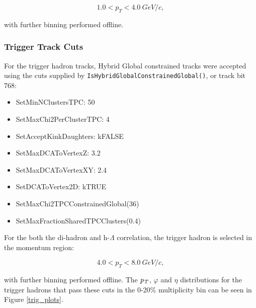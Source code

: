 \documentclass[ALICE,manyauthors]{ALICE_analysis_notes}
\begin{document}
$${1.0 < p_{T} < \SI{4.0}{GeV/c}},$$

with further binning performed offline.

\subsubsection{Trigger Track Cuts}
\label{trigcuts}
For the trigger hadron tracks, Hybrid Global constrained tracks were accepted using the cuts supplied by \texttt{IsHybridGlobalConstrainedGlobal()}, or track bit 768:

\begin{itemize}
	\item SetMinNClustersTPC: 50
	\item SetMaxChi2PerClusterTPC: 4
	\item SetAcceptKinkDaughters: kFALSE
	\item SetMaxDCAToVertexZ: 3.2
	\item SetMaxDCAToVertexXY: 2.4
	\item SetDCAToVertex2D: kTRUE
	\item SetMaxChi2TPCConstrainedGlobal(36)
	\item SetMaxFractionSharedTPCClusters(0.4)
\end{itemize}

For the both the di-hadron and h-$\Lambda$ correlation, the trigger hadron is selected in the momentum region:

$${4.0 < p_{T} < \SI{8.0}{GeV/c}},$$

with further binning performed offline. The $\it{p}_{T}$, $\varphi$ and $\eta$ distributions for the trigger hadrons that pass these cuts in the 0-20\% multiplicity bin can be seen in Figure \ref{trig_plots}.
\end{document}
